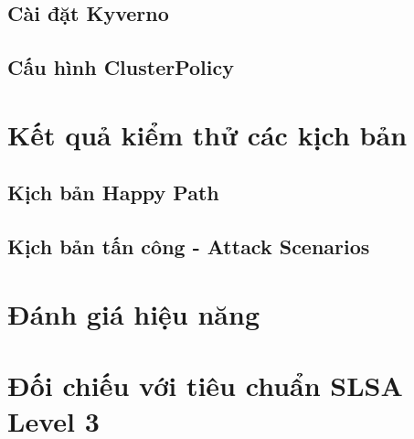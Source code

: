 \subsection{Cài đặt Kyverno}

\subsection{Cấu hình ClusterPolicy}

\section{Kết quả kiểm thử các kịch bản}

\subsection{Kịch bản Happy Path}

\subsection{Kịch bản tấn công - Attack Scenarios}


\section{Đánh giá hiệu năng}


\section{Đối chiếu với tiêu chuẩn SLSA Level 3}

